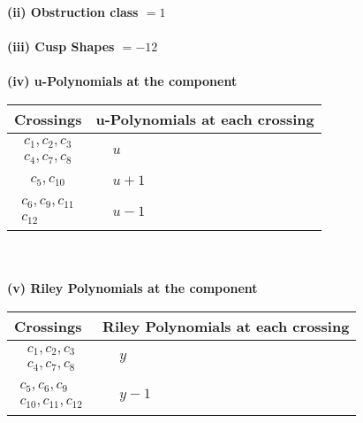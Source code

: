 \documentclass[1p]{elsarticle_modified}
\theoremstyle{definition}
\begin{document}
\flushleft \textbf{(ii) Obstruction class $= 1$}\\~\\
\flushleft \textbf{(iii) Cusp Shapes $= -12$}\\~\\
\newpage\renewcommand{\arraystretch}{1}
\flushleft \textbf{(iv) u-Polynomials at the component}\newline \\
\begin{tabular}{m{50pt}|m{274pt}}
Crossings & \hspace{64pt}u-Polynomials at each crossing \\
\hline $$\begin{aligned}c_{1},c_{2},c_{3}\\c_{4},c_{7},c_{8}\end{aligned}$$&$\begin{aligned}
&u
\end{aligned}$\\
\hline $$\begin{aligned}c_{5},c_{10}\end{aligned}$$&$\begin{aligned}
&u+1
\end{aligned}$\\
\hline $$\begin{aligned}c_{6},c_{9},c_{11}\\c_{12}\end{aligned}$$&$\begin{aligned}
&u-1
\end{aligned}$\\
\hline
\end{tabular}\\~\\
\newpage\renewcommand{\arraystretch}{1}
\flushleft \textbf{(v) Riley Polynomials at the component}\newline \\
\begin{tabular}{m{50pt}|m{274pt}}
Crossings & \hspace{64pt}Riley Polynomials at each crossing \\
\hline $$\begin{aligned}c_{1},c_{2},c_{3}\\c_{4},c_{7},c_{8}\end{aligned}$$&$\begin{aligned}
&y
\end{aligned}$\\
\hline $$\begin{aligned}c_{5},c_{6},c_{9}\\c_{10},c_{11},c_{12}\end{aligned}$$&$\begin{aligned}
&y-1
\end{aligned}$\\
\hline
\end{tabular}\\~\\
\end{document}
